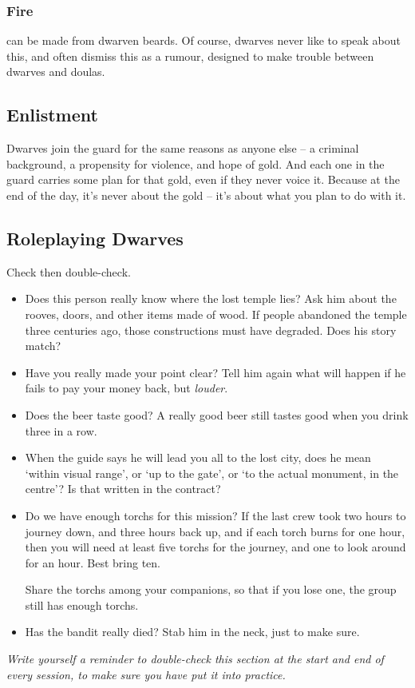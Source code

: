 \subsubsection{Fire }
can be made from dwarven beards.
Of course, dwarves never like to speak about this, and often dismiss this as a rumour, designed to make trouble between dwarves and \glspl{doula}.

\subsection{Enlistment}

Dwarves join the \gls{guard} for the same reasons as anyone else -- a criminal background, a propensity for violence, and hope of gold.
And each one in the \gls{guard} carries some plan for that gold, even if they never voice it.
Because at the end of the day, it's never about the gold -- it's about what you plan to do with it.

\subsection{Roleplaying Dwarves}

Check then double-check.

\begin{itemize}
  \item
  Does this person really know where the lost temple lies?
  Ask him about the rooves, doors, and other items made of wood.
  If people abandoned the temple three centuries ago, those constructions must have degraded.
  Does his story match?
  \item
  Have you really made your point clear?
  Tell him again what will happen if he fails to pay your money back, but \emph{louder}.
  \item
  Does the beer taste good?
  A really good beer still tastes good when you drink three in a row.
  \item
  When the guide says he will lead you all to the lost city, does he mean `within visual range', or `up to the gate', or `to the actual monument, in the centre'?
  Is that written in the contract?
  \item
  Do we have enough \glspl{torch} for this mission?
  If the last crew took two hours to journey down, and three hours back up, and if each \gls{torch} burns for one hour, then you will need at least five \glspl{torch} for the journey, and one to look around for an hour.
  Best bring ten.

  Share the \glspl{torch} among your companions, so that if you lose one, the group still has enough \glspl{torch}.
  \item
  Has the bandit really died?
  Stab him in the neck, just to make sure.
\end{itemize}

\emph{Write yourself a reminder to double-check this section at the start and end of every session, to make sure you have put it into practice.}


